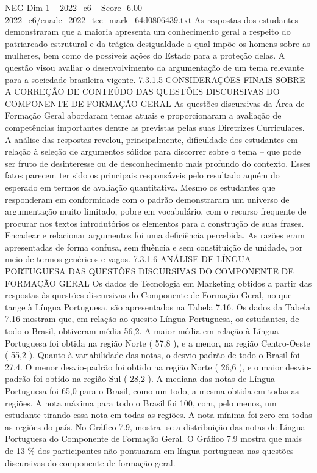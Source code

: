 \begin{textsample}{NEG Dim 1 – 2022\_c6 – Score -6.00 – 2022\_c6/enade\_2022\_tec\_mark\_64d0806439.txt}
As respostas dos estudantes demonstraram que a maioria apresenta um conhecimento geral a respeito do patriarcado estrutural e da trágica desigualdade a qual impõe os homens sobre as mulheres, bem como de possíveis ações do Estado para a proteção delas.
A questão visou avaliar o desenvolvimento da argumentação de um tema relevante para a sociedade brasileira vigente. 7.3.1.5 CONSIDERAÇÕES FINAIS SOBRE A CORREÇÃO DE CONTEÚDO DAS QUESTÕES DISCURSIVAS DO COMPONENTE DE FORMAÇÃO GERAL As questões discursivas da Área de Formação Geral abordaram temas atuais e proporcionaram a avaliação de competências importantes dentre as previstas pelas suas Diretrizes Curriculares.
A análise das respostas revelou, principalmente, dificuldade dos estudantes em relação à seleção de argumentos sólidos para discorrer sobre o tema – que pode ser fruto de desinteresse ou de desconhecimento mais profundo do contexto.
Esses fatos parecem ter sido os principais responsáveis pelo resultado aquém do esperado em termos de avaliação quantitativa.
Mesmo os estudantes que responderam em conformidade com o padrão demonstraram um universo de argumentação muito limitado, pobre em vocabulário, com o recurso frequente de procurar nos textos introdutórios os elementos para a construção de suas frases.
Encadear e relacionar argumentos foi uma deficiência percebida.
As razões eram apresentadas de forma confusa, sem fluência e sem constituição de unidade, por meio de termos genéricos e vagos. 7.3.1.6 ANÁLISE DE LÍNGUA PORTUGUESA DAS QUESTÕES DISCURSIVAS DO COMPONENTE DE FORMAÇÃO GERAL Os dados de Tecnologia em Marketing obtidos a partir das respostas às questões discursivas do Componente de Formação Geral, no que tange à Língua Portuguesa, são apresentados na Tabela 7.16.
Os dados da Tabela 7.16 mostram que, em relação ao quesito Língua Portuguesa, os estudantes, de todo o Brasil, obtiveram média 56,2.
A maior média em relação à Língua Portuguesa foi obtida na região Norte ( 57,8 ), e a menor, na região Centro-Oeste ( 55,2 ).
Quanto à variabilidade das notas, o desvio-padrão de todo o Brasil foi 27,4.
O menor desvio-padrão foi obtido na região Norte ( 26,6 ), e o maior desvio-padrão foi obtido na região Sul ( 28,2 ).
A mediana das notas de Língua Portuguesa foi 65,0 para o Brasil, como um todo, a mesma obtida em todas as regiões.
A nota máxima para todo o Brasil foi 100, com, pelo menos, um estudante tirando essa nota em todas as regiões.
A nota mínima foi zero em todas as regiões do país.
No Gráfico 7.9, mostra -se a distribuição das notas de Língua Portuguesa do Componente de Formação Geral.
O Gráfico 7.9 mostra que mais de 13 \% dos participantes não pontuaram em língua portuguesa nas questões discursivas do componente de formação geral.

\end{textsample}
